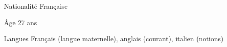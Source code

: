 
\begin{cvskills}

	\cvskill
	{Nationalité}
    {Française}

	\cvskill
	{Âge}
    {27 ans}

	\cvskill
	{Langues}
    {Français (langue maternelle), anglais (courant), italien (notions)}

\end{cvskills}
